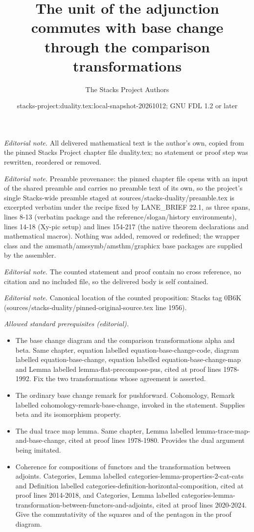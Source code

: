 \documentclass[10pt,a4paper]{amsart}
\title{The unit of the adjunction commutes with base change through the comparison transformations}
\author{The Stacks Project Authors}
\date{stacks-project:duality.tex:local-snapshot-20261012; GNU FDL 1.2 or later}
\theoremstyle{plain}
\theoremstyle{definition}
\theoremstyle{remark}
\numberwithin{equation}{subsection}
\begin{document}
\maketitle
\noindent\textit{Editorial note.} All delivered mathematical text is the author's own, copied from the pinned Stacks Project chapter file duality.tex; no statement or proof step was rewritten, reordered or removed.\par\medskip
\noindent\textit{Editorial note.} Preamble provenance: the pinned chapter file opens with an input of the shared preamble and carries no preamble text of its own, so the project's single Stacks-wide preamble staged at sources/stacks-duality/preamble.tex is excerpted verbatim under the recipe fixed by LANE\_BRIEF 22.1, as three spans, lines 8-13 (verbatim package and the reference/slogan/history environments), lines 14-18 (Xy-pic setup) and lines 154-217 (the native theorem declarations and mathematical macros). Nothing was added, removed or redefined; the wrapper class and the amsmath/amssymb/amsthm/graphicx base packages are supplied by the assembler.\par\medskip
\noindent\textit{Editorial note.} The counted statement and proof contain no cross reference, no citation and no included file, so the delivered body is self contained.\par\medskip
\noindent\textit{Editorial note.} Canonical location of the counted proposition: Stacks tag 0B6K (sources/stacks-duality/pinned-original-source.tex line 1956).\par\medskip
\noindent\textit{Allowed standard prerequisites (editorial).}\begin{itemize}
\item The base change diagram and the comparison transformations alpha and beta. Same chapter, equation labelled equation-base-change-code, diagram labelled equation-base-change, equation labelled equation-base-change-map and Lemma labelled lemma-flat-precompose-pus, cited at proof lines 1978-1992. Fix the two transformations whose agreement is asserted.
\item The ordinary base change remark for pushforward. Cohomology, Remark labelled cohomology-remark-base-change, invoked in the statement. Supplies beta and its isomorphism property.
\item The dual trace map lemma. Same chapter, Lemma labelled lemma-trace-map-and-base-change, cited at proof lines 1978-1980. Provides the dual argument being imitated.
\item Coherence for compositions of functors and the transformation between adjoints. Categories, Lemma labelled categories-lemma-properties-2-cat-cats and Definition labelled categories-definition-horizontal-composition, cited at proof lines 2014-2018, and Categories, Lemma labelled categories-lemma-transformation-between-functors-and-adjoints, cited at proof lines 2020-2024. Give the commutativity of the squares and of the pentagon in the proof diagram.
\end{itemize}\medskip
\end{document}
